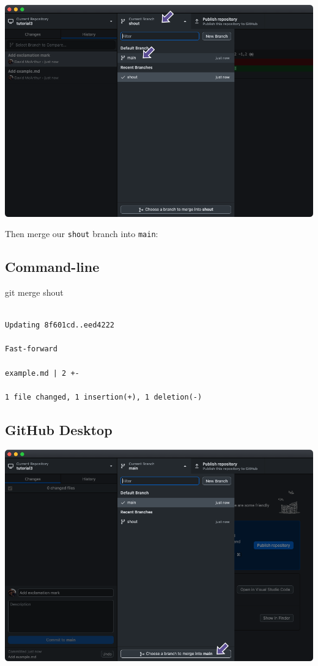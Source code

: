 \documentclass[
  letterpaper,
  DIV=11,
  numbers=noendperiod]{scrartcl}
\newenvironment{Shaded}{\begin{snugshade}}{\end{snugshade}}
\newcommand{\FunctionTok}[1]{\textcolor[rgb]{0.28,0.35,0.67}{#1}}
\newcommand{\NormalTok}[1]{\textcolor[rgb]{0.00,0.23,0.31}{#1}}
\begin{document}
\includegraphics{images/image32.png}

Then merge our \texttt{shout} branch into \texttt{main}:

\subsection{Command-line}

\begin{Shaded}
\begin{Highlighting}[]
\FunctionTok{git}\NormalTok{ merge shout}
\end{Highlighting}
\end{Shaded}

\begin{verbatim}

Updating 8f601cd..eed4222

Fast-forward

example.md | 2 +-

1 file changed, 1 insertion(+), 1 deletion(-)
\end{verbatim}

\subsection{GitHub Desktop}

\includegraphics{images/image33.png}
\end{document}
